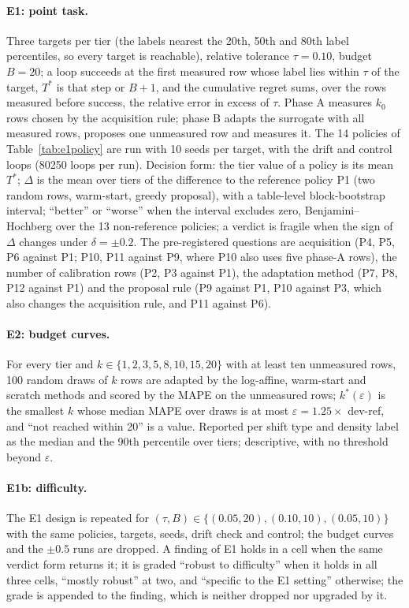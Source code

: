 \documentclass[11pt,a4paper]{article}
\begin{document}
\paragraph{E1: point task.} Three targets per tier (the labels nearest the 20th, 50th and 80th
label percentiles, so every target is reachable), relative tolerance $\tau = 0.10$, budget
$B = 20$; a loop succeeds at the first measured row whose label lies within $\tau$ of the target,
$T^{*}$ is that step or $B + 1$, and the cumulative regret sums, over the rows
measured before success, the relative error in excess of $\tau$. Phase A measures $k_0$ rows chosen by the acquisition rule; phase B adapts
the surrogate with all measured rows, proposes one unmeasured row and measures it. The 14
policies of Table~\ref{tab:e1policy} are run with 10 seeds per target, with the drift and
control loops (80250 loops per run). Decision form: the tier value of a policy is its mean
$T^{*}$; $\Delta$ is the mean over tiers of the difference to the reference policy P1 (two random
rows, warm-start, greedy proposal), with a table-level block-bootstrap interval; ``better'' or
``worse'' when the interval excludes zero, Benjamini--Hochberg over the 13 non-reference
policies; a verdict is fragile when the sign of $\Delta$ changes under $\delta = \pm 0.2$. The
pre-registered questions are acquisition (P4, P5, P6 against P1; P10, P11 against P9, where P10 also
uses five phase-A rows), the number of calibration rows (P2, P3 against P1), the adaptation method
(P7, P8, P12 against P1) and the proposal rule (P9 against P1, P10 against P3, which also changes the
acquisition rule, and P11 against P6).

\paragraph{E2: budget curves.} For every tier and $k \in \{1, 2, 3, 5, 8, 10, 15, 20\}$ with at
least ten unmeasured rows, 100 random draws of $k$ rows are adapted by the log-affine,
warm-start and scratch methods and scored by the MAPE on the unmeasured rows; $k^{*}(\varepsilon)$ is the
smallest $k$ whose median MAPE over draws is at most $\varepsilon = 1.25 \times$ dev-ref, and ``not
reached within 20'' is a value. Reported per shift type and density label as the median and the
90th percentile over tiers; descriptive, with no threshold beyond $\varepsilon$.

\paragraph{E1b: difficulty.} The E1 design is repeated for $(\tau, B) \in \{(0.05, 20), (0.10, 10),
(0.05, 10)\}$ with the same policies, targets, seeds, drift check and control; the budget curves and
the $\pm 0.5$ runs are dropped. A finding of E1 holds in a cell when the same verdict form returns
it; it is graded ``robust to difficulty'' when it holds in all three cells, ``mostly robust'' at two,
and ``specific to the E1 setting'' otherwise; the grade is appended to the finding, which is neither
dropped nor upgraded by it.
\end{document}
